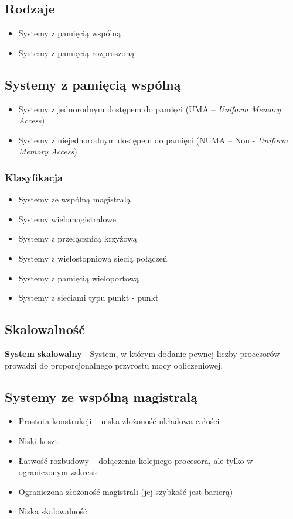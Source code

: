 	\subsection{Rodzaje}
		\begin{itemize}
			\item Systemy z pamięcią wspólną
			\item Systemy z pamięcią rozproszoną
		\end{itemize}
	\subsection{Systemy z pamięcią wspólną}
		\begin{itemize}
			\item Systemy z jednorodnym dostępem do pamięci (UMA – \emph{Uniform Memory Access})
			\item Systemy z niejednorodnym dostępem do pamięci (NUMA – Non 	- \emph{Uniform Memory Access})
		\end{itemize}
		\subsubsection{Klasyfikacja}
			\begin{itemize}
				\item Systemy ze wspólną magistralą
				\item Systemy wielomagistralowe
				\item Systemy z przełącznicą krzyżową
				\item Systemy z wielostopniową siecią połączeń
				\item Systemy z pamięcią wieloportową
				\item Systemy z sieciami typu punkt - punkt
			\end{itemize}
	\subsection{Skalowalność}
		\textbf{System skalowalny} - System, w którym dodanie pewnej liczby procesorów prowadzi do proporcjonalnego przyrostu mocy obliczeniowej.
	\subsection{Systemy ze wspólną magistralą}
		\begin{itemize}
			\item Prostota konstrukcji – niska złożoność układowa całości
			\item Niski koszt
			\item Łatwość rozbudowy – dołączenia kolejnego procesora, ale tylko w ograniczonym zakresie
			\item Ograniczona złożoność magistrali (jej szybkość jest barierą)
			\item Niska skalowalność
		\end{itemize}

